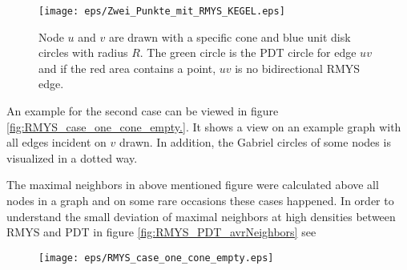\begin{figure}[h!]
\centering
\texttt{[image: eps/Zwei\_Punkte\_mit\_RMYS\_KEGEL.eps]}
\caption{Node $u $ and $v $ are drawn with a specific cone and blue unit disk circles with radius $R $. The green circle is the PDT circle for edge $uv $ and if the red area contains a point, $uv $ is no bidirectional RMYS edge.}
\label{fig:RMYS_ErrorBiderectionalEdges}
\end{figure}

An example for the second case can be viewed in figure \ref{fig:RMYS_case_one_cone_empty.}.
It shows a view on an example graph with all edges incident on $v $ drawn.
In addition, the Gabriel circles of some nodes is visualized in a dotted way.


The maximal neighbors in above mentioned figure were calculated above all nodes in a graph and on some rare occasions these cases happened.
In order to understand the small deviation of maximal neighbors at high densities between RMYS and PDT in figure \ref{fig:RMYS_PDT_avrNeighbors} see 


\begin{figure}[h!]
\centering
\texttt{[image: eps/RMYS\_case\_one\_cone\_empty.eps]}
\caption{}
\label{fig:RMYS_case_one_cone_empty}
\end{figure}


